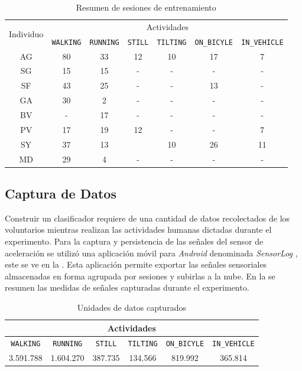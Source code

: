 \begin{table}[h]
\begin{centering}
\begin{tabular}{|c|c|c|c|c|c|c|}
\hline 
\multirow{2}{*}{Individuo} & \multicolumn{6}{c|}{Actividades}\tabularnewline
\cline{2-7} 
 & \texttt{\footnotesize{}WALKING} & \texttt{\footnotesize{}RUNNING} & \texttt{\footnotesize{}STILL} & \texttt{\footnotesize{}TILTING} & \texttt{\footnotesize{}ON\_BICYLE} & \texttt{\footnotesize{}IN\_VEHICLE}\tabularnewline
\hline 
\hline 
AG & 80 & 33 & 12 & 10 & 17 & 7\tabularnewline
\hline 
SG & 15 & 15 & - & - & - & -\tabularnewline
\hline 
SF & 43 & 25 & - & - & 13 & -\tabularnewline
\hline 
GA & 30 & 2 & - & - & - & -\tabularnewline
\hline 
BV & - & 17 & - & - & - & -\tabularnewline
\hline 
PV & 17 & 19 & 12 & - & - & 7\tabularnewline
\hline 
SY & 37 & 13 &  & 10 & 26 & 11\tabularnewline
\hline 
MD & 29 & 4 & - & - & - & -\tabularnewline
\hline 
\end{tabular}
\par\end{centering}
\caption{\label{tab6:sesiones}Resumen de sesiones de entrenamiento}
\end{table}


\subsection{Captura de Datos}

Construir un clasificador requiere de una cantidad de datos recolectados
de los voluntarios mientras realizan las actividades humanas dictadas
durante el experimento. Para la captura y persistencia de las señales
del sensor de aceleración se utilizó una aplicación móvil para \emph{Android
}denominada \emph{SensorLog} \cite{Alan2014s}, este se ve en la .
Esta aplicación permite exportar las señales sensoriales almacenadas
en forma agrupada por sesiones y subirlas a la nube. En la 
se resumen las medidas de señales capturadas durante el experimento.

\begin{table}[h]
\begin{centering}
\begin{tabular}{|c|c|c|c|c|c|}
\hline 
\multicolumn{6}{|c|}{Actividades}\tabularnewline
\hline 
\texttt{\footnotesize{}WALKING} & \texttt{\footnotesize{}RUNNING} & \texttt{\footnotesize{}STILL} & \texttt{\footnotesize{}TILTING} & \texttt{\footnotesize{}ON\_BICYLE} & \texttt{\footnotesize{}IN\_VEHICLE}\tabularnewline
\hline 
\hline 
3.591.788 & 1.604.270 & 387.735 & 134.566 & 819.992 & 365.814\tabularnewline
\hline 
\end{tabular}
\par\end{centering}
\caption{\label{tab6:captura}Unidades de datos capturados}
\end{table}


